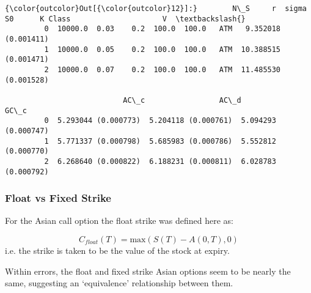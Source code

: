 \documentclass{article}
\begin{document}
            \begin{Verbatim}[commandchars=\\\{\}]
{\color{outcolor}Out[{\color{outcolor}12}]:}        N\_S     r  sigma     S0      K Class                     V  \textbackslash{}
         0  10000.0  0.03    0.2  100.0  100.0   ATM   9.352018 (0.001411)   
         1  10000.0  0.05    0.2  100.0  100.0   ATM  10.388515 (0.001471)   
         2  10000.0  0.07    0.2  100.0  100.0   ATM  11.485530 (0.001528)   
         
                           AC\_c                 AC\_d                 GC\_c  
         0  5.293044 (0.000773)  5.204118 (0.000761)  5.094293 (0.000747)  
         1  5.771337 (0.000798)  5.685983 (0.000786)  5.552812 (0.000770)  
         2  6.268640 (0.000822)  6.188231 (0.000811)  6.028783 (0.000792)  
\end{Verbatim}
        
    \subsubsection{Float vs Fixed Strike}\label{float-vs-fixed-strike}

For the Asian call option the float strike was defined here as:

\begin{equation}
C_{float}(T) = \text{max}\left( S(T) -  A(0,T), 0 \right)
\end{equation}
i.e. the strike is taken to be the value of the stock at expiry.

Within errors, the float and fixed strike Asian options seem to be
nearly the same, suggesting an `equivalence' relationship between them.
\end{document}
